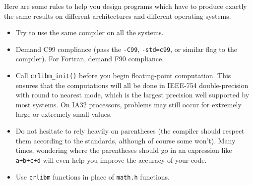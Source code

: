 Here are some rules to help you design programs which have to
produce exactly the same results on different architectures and
different operating systems.
\begin{itemize}
\item Try to use the same compiler on all the systems.
\item Demand C99 compliance (pass the \texttt{-C99},
  \texttt{-std=c99}, or similar flag to the compiler). For Fortran,
  demand F90 compliance.
\item Call \texttt{crlibm\_init()} before you begin floating-point
  computation. This ensures that the computations will all be done in
  IEEE-754 double-precision with round to nearest mode, which is the
  largest precision well supported by most systems. On IA32
  processors, problems may still occur for extremely large or
  extremely small values.
\item Do not hesitate to rely heavily on parentheses (the compiler
  should respect them according to the standards, although of course some
  won't). Many times, wondering where the parentheses should go in an
  expression like \texttt{a+b+c+d} will even help you improve the
  accuracy of your code.
\item Use \texttt{crlibm} functions in place of \texttt{math.h} functions.
\end{itemize}

